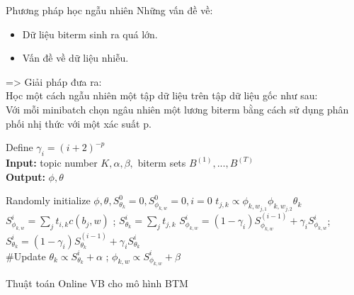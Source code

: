 \documentclass[pdf]{beamer}
\begin{document}
\begin{frame}{Phương pháp học ngẫu nhiên}
	Những vấn đề về:
	\begin{itemize}
		\item Dữ liệu biterm sinh ra quá lớn.
		\item Vấn đề về dữ liệu nhiễu.
	\end{itemize}
	=> Giải pháp đưa ra:\\
	Học một cách ngẫu nhiên một tập dữ liệu trên tập dữ liệu gốc như sau:\\
	Với mỗi minibatch chọn ngâu nhiên một lương biterm bằng cách sử dụng phân phối nhị thức với một xác suất p.
\end{frame}
\begin{frame}
\begin{algorithm}[H]
	Define $ \gamma_i = (i+2)^{-p}$ \\
	\textbf{Input: } topic number $K, \alpha, \beta,$ biterm sets $B^{(1)}, ..., B^{(T)}$  \\
	\textbf{Output: } $\phi, \theta$ 
	\begin{algorithmic}[1]
		\STATE Randomly initialize $\phi, \theta,  S_{\theta_k}^0 = 0, S_{\phi_{k, w}}^0 = 0, i = 0$
		\STATE $ t_{j, k} \propto {\phi_{k,w_{j,1}} \phi_{k,w_{j,2}} \theta_k}$
		\ENDFOR
		\STATE  $S_{\phi_{k, w}}^i = \sum_{j}{t_{i, k}c(b_j, w)}$ ; \space  $S_{\theta_k}^i = \sum_{j}{t_{j, k}} $
		\STATE$S_{\phi_{k, w}}^i = (1 - \gamma_i) S_{\phi_{k, w}}^{(i-1)} + \gamma_i S_{\phi_{k, w}}^i$; \space $S_{\theta_k}^i = (1 - \gamma_i)S_{\theta_k}^{(i-1)} + \gamma_i S_{\theta_k}^i$\\ \#Update
		\STATE $\theta_k \propto S_{\theta_k}^i + \alpha$ ; \space $\phi_{k, w} \propto S_{\phi_{k, w}}^i + \beta $
		\ENDFOR
	\end{algorithmic}
	\caption{Thuật toán Online VB cho mô hình BTM}
	\label{alg:seq}
\end{algorithm}
\end{frame}
\end{document}
